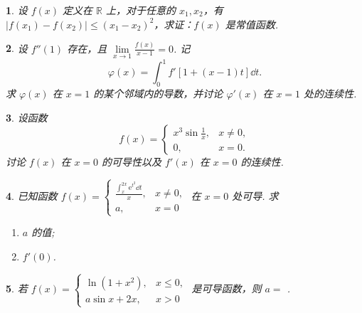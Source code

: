 \documentclass[openany,twocolumn]{ctexbook}
\theoremstyle{change}
\newtheorem{ti}{}[section]
\newcommand{\hone}[1]{ \uline{\hspace{#1 pc}}}
\def\leq{\leqslant}
\def\ee{\mathrm{e}}
\edef\lim{\lim\limits}
\begin{document}
	\begin{ti}
		设 $f(x)$ 定义在 $\mathbb{R}$ 上，对于任意的 $x_{1},x_{2}$，有 $|f(x_{1}) - f(x_{2})| \leq (x_{1} - x_{2})^{2}$，求证：$f(x)$ 是常值函数.
	\end{ti}

	\begin{ti}
		设 $f''(1)$ 存在，且 $\lim_{x \to 1}\frac{f(x)}{x - 1} = 0$. 记
		\[
			\varphi(x) = \int_{0}^{1} f'[1 + (x - 1)t]\dd{t}.
		\]
		求 $\varphi(x)$ 在 $x = 1$ 的某个邻域内的导数，并讨论 $\varphi'(x)$ 在 $x = 1$ 处的连续性.
	\end{ti}

	\begin{ti}
		设函数
		\[
			f(x) = \begin{cases}
				x^{3} \sin\frac{1}{x}, & x \ne 0,\\
				0, & x = 0.
			\end{cases}
		\]
		讨论 $f(x)$ 在 $x = 0$ 的可导性以及 $f'(x)$ 在 $x = 0$ 的连续性.
	\end{ti}

	\begin{ti}
		已知函数 $f(x) = \begin{cases}
			\frac{\int_{x}^{2x} \ee^{t^{2}} \dd{t}}{x}, & x \ne 0,\\
			a, & x = 0
		\end{cases}$ 在 $x = 0$ 处可导. 求
		\begin{enumerate}
			\item $a$ 的值;
			\item $f'(0)$.
		\end{enumerate}
	\end{ti}

	\begin{ti}
		若 $f(x) = \begin{cases}
			\ln\left( 1 + x^{2} \right), & x \leq 0,\\
			a \sin x + 2x, & x > 0
		\end{cases}$ 是可导函数，则 $a = $\hone{2}.
	\end{ti}
\end{document}
